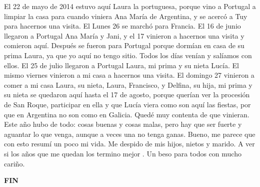 \documentclass[12pt,a5paper]{book}
\begin{document}
El 22 de mayo de 2014 estuvo aquí Laura la portuguesa, porque vino a Portugal a limpiar la casa para cuando viniera Ana María de Argentina, y se acercó a Tuy para hacernos una visita. El Lunes 26 se marchó para Francia.
El 16 de junio llegaron a Portugal Ana María y Jani, y el 17 vinieron a hacernos una visita y comieron aquí. Después se fueron para Portugal porque dormían en casa de su prima Laura, ya que yo aquí no tengo sitio. Todos los días venían y salíamos con ellos.
El 25 de julio llegaron a Portugal Laura, mi prima y su nieta Lucía. El mismo viernes vinieron a mi casa a hacernos una visita. El domingo 27 vinieron a comer a mi casa Laura, su nieta, Laura, Francisco, y Delfina, su hija, mi prima y su nieta se quedaron aquí hasta el 17 de agosto, porque querían ver la procesión de San Roque, participar en ella y que Lucía viera como son aquí las fiestas, por que en Argentina no son como en Galicia. Quedé muy contenta de que vinieran.
Este año hubo de todo: cosas buenas y cosas malas, pero hay que ser fuerte y aguantar lo que venga, aunque a veces una no tenga ganas.
Bueno, me parece que con esto resumí un poco mi vida. Me despido de mis hijos, nietos y marido. A ver si los años que me quedan los termino mejor . Un beso para todos con mucho cariño.



\begin{center}
\textbf{FIN}
\end{center}
\end{document}
